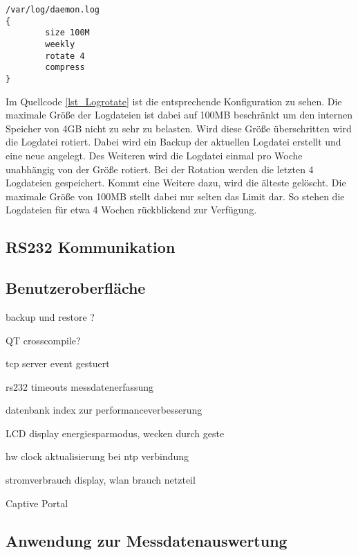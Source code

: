 \begin{lstlisting}[caption={Logrotate},label=lst_Logrotate]
/var/log/daemon.log
{
        size 100M
        weekly
        rotate 4
        compress
}
\end{lstlisting}

Im Quellcode \ref{lst_Logrotate} ist die entsprechende Konfiguration zu sehen. Die maximale Größe der Logdateien ist dabei auf 100MB beschränkt um den internen Speicher von 4GB nicht zu sehr zu belasten. Wird diese Größe überschritten wird die Logdatei rotiert. Dabei wird ein Backup der aktuellen Logdatei erstellt und eine neue angelegt. Des Weiteren wird die Logdatei einmal pro Woche unabhängig von der Größe rotiert. Bei der Rotation werden die letzten 4 Logdateien gespeichert. Kommt eine Weitere dazu, wird die älteste gelöscht. Die maximale Größe von 100MB stellt dabei nur selten das Limit dar. So stehen die Logdateien für etwa 4 Wochen rückblickend zur Verfügung.



\subsection{RS232 Kommunikation}

\subsection{Benutzeroberfläche}









backup und restore ?

QT crosscompile?

tcp server event gestuert

rs232 timeouts messdatenerfassung

datenbank index zur performanceverbesserung

LCD display energiesparmodus, wecken durch geste


hw clock aktualisierung bei ntp verbindung


stromverbrauch display, wlan brauch netzteil

Captive Portal




\subsection{Anwendung zur Messdatenauswertung}